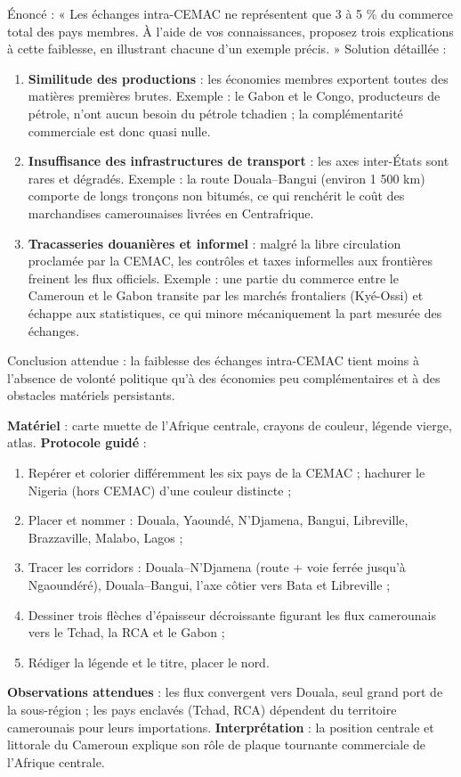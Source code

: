 \documentclass[11pt]{article}
\begin{document}
\begin{exoresolu}
Énoncé : « Les échanges intra-CEMAC ne représentent que 3 à 5 \% du commerce total des pays membres. À l'aide de vos connaissances, proposez trois explications à cette faiblesse, en illustrant chacune d'un exemple précis. »
\tcblower
Solution détaillée :
\begin{enumerate}
\item \textbf{Similitude des productions} : les économies membres exportent toutes des matières premières brutes. Exemple : le Gabon et le Congo, producteurs de pétrole, n'ont aucun besoin du pétrole tchadien ; la complémentarité commerciale est donc quasi nulle.
\item \textbf{Insuffisance des infrastructures de transport} : les axes inter-États sont rares et dégradés. Exemple : la route Douala--Bangui (environ 1 500 km) comporte de longs tronçons non bitumés, ce qui renchérit le coût des marchandises camerounaises livrées en Centrafrique.
\item \textbf{Tracasseries douanières et informel} : malgré la libre circulation proclamée par la CEMAC, les contrôles et taxes informelles aux frontières freinent les flux officiels. Exemple : une partie du commerce entre le Cameroun et le Gabon transite par les marchés frontaliers (Kyé-Ossi) et échappe aux statistiques, ce qui minore mécaniquement la part mesurée des échanges.
\end{enumerate}
Conclusion attendue : la faiblesse des échanges intra-CEMAC tient moins à l'absence de volonté politique qu'à des économies peu complémentaires et à des obstacles matériels persistants.
\end{exoresolu}

\begin{experience}
\textbf{Matériel} : carte muette de l'Afrique centrale, crayons de couleur, légende vierge, atlas.
\textbf{Protocole guidé} :
\begin{enumerate}
\item Repérer et colorier différemment les six pays de la CEMAC ; hachurer le Nigeria (hors CEMAC) d'une couleur distincte ;
\item Placer et nommer : Douala, Yaoundé, N'Djamena, Bangui, Libreville, Brazzaville, Malabo, Lagos ;
\item Tracer les corridors : Douala--N'Djamena (route + voie ferrée jusqu'à Ngaoundéré), Douala--Bangui, l'axe côtier vers Bata et Libreville ;
\item Dessiner trois flèches d'épaisseur décroissante figurant les flux camerounais vers le Tchad, la RCA et le Gabon ;
\item Rédiger la légende et le titre, placer le nord.
\end{enumerate}
\textbf{Observations attendues} : les flux convergent vers Douala, seul grand port de la sous-région ; les pays enclavés (Tchad, RCA) dépendent du territoire camerounais pour leurs importations.
\textbf{Interprétation} : la position centrale et littorale du Cameroun explique son rôle de plaque tournante commerciale de l'Afrique centrale.
\end{experience}
\end{document}
